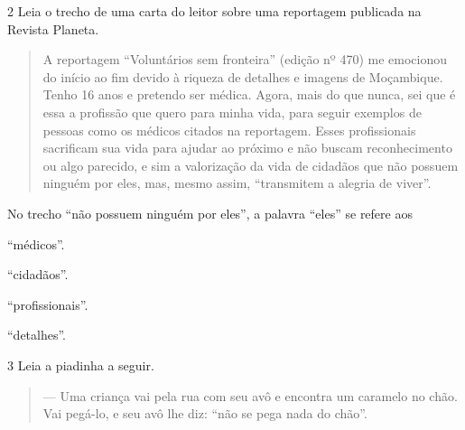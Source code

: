 \begin{escolha}
\begin{escolha}
\num{2} Leia o trecho de uma carta do leitor sobre uma reportagem
publicada na Revista Planeta.

\begin{quote}
A reportagem ``Voluntários sem fronteira'' (edição nº 470) me emocionou
do início ao fim devido à riqueza de detalhes e imagens de Moçambique.
Tenho 16 anos e pretendo ser médica. Agora, mais do que nunca, sei que é
essa a profissão que quero para minha vida, para seguir exemplos de
pessoas como os médicos citados na reportagem. Esses profissionais
sacrificam sua vida para ajudar ao próximo e não buscam reconhecimento
ou algo parecido, e sim a valorização da vida de cidadãos que não
possuem ninguém por eles, mas, mesmo assim, ``transmitem a alegria de
viver''.

\end{quote}

No trecho ``não possuem ninguém por eles'', a palavra ``eles'' se refere
aos

\begin{escolha}
\item ``médicos''.

\item ``cidadãos''.

\item ``profissionais''.

\item ``detalhes''.
\end{escolha}


\num{3} Leia a piadinha a seguir.

\begin{quote}
--- Uma criança vai pela rua com seu avô e encontra um caramelo no chão.
Vai pegá-lo, e seu avô lhe diz: ``não se pega nada do chão''.


\end{quote}
\end{escolha}
\end{escolha}
